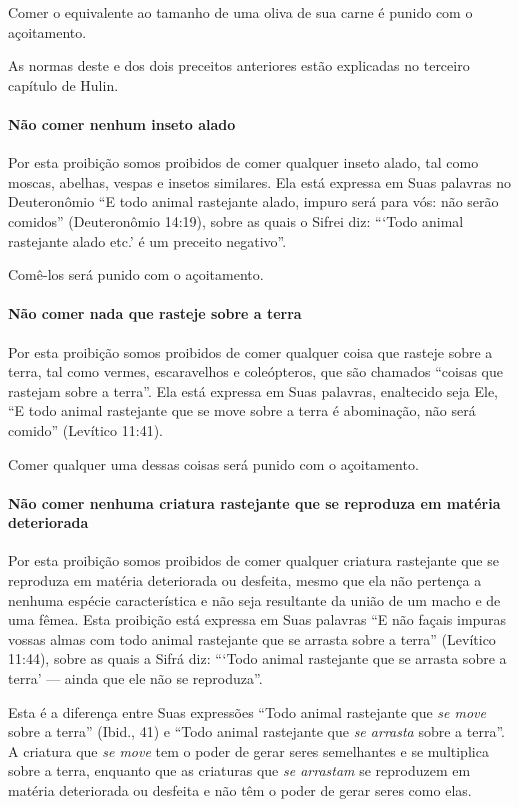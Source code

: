 Comer o equivalente ao tamanho de uma oliva de sua carne é punido com o
açoitamento.

As normas deste e dos dois preceitos anteriores estão explicadas no
terceiro capítulo de Hulin.

\paragraph{Não comer nenhum inseto alado}

Por esta proibição somos proibidos de comer qualquer inseto alado, tal
como moscas, abelhas, vespas e insetos similares. Ela está expressa em
Suas palavras no Deuteronômio ``E todo animal rastejante alado, impuro
será para vós: não serão comidos'' (Deuteronômio 14:19), sobre as quais
o Sifrei diz: ```Todo animal rastejante alado etc.' é um preceito
negativo''.

Comê-los será punido com o açoitamento.

\paragraph{Não comer nada que rasteje sobre a terra}

Por esta proibição somos proibidos de comer qualquer coisa que rasteje
sobre a terra, tal como vermes, escaravelhos e coleópteros, que são
chamados ``coisas que rastejam sobre a terra''. Ela está expressa em
Suas palavras, enaltecido seja Ele, ``E todo animal rastejante que se
move sobre a terra é abominação, não será comido'' (Levítico 11:41).

Comer qualquer uma dessas coisas será punido com o açoitamento.

\paragraph{Não comer nenhuma criatura rastejante que se reproduza em matéria
deteriorada}

Por esta proibição somos proibidos de comer qualquer criatura
rastejante que se reproduza em matéria deteriorada ou desfeita, mesmo
que ela não pertença a nenhuma espécie característica e não seja
resultante da união de um macho e de uma fêmea. Esta proibição está
expressa em Suas palavras
``E não façais impuras vossas almas com todo animal rastejante que se
arrasta sobre a terra'' (Levítico 11:44), sobre as quais a Sifrá diz:
```Todo animal rastejante que se arrasta sobre a terra' --- ainda que
ele não se reproduza''.

Esta é a diferença entre Suas expressões ``Todo animal rastejante que
\emph{se move} sobre a terra'' (Ibid., 41) e ``Todo animal rastejante
que \emph{se arrasta} sobre a terra''. A criatura que \emph{se move} tem
o poder de gerar seres semelhantes e se multiplica sobre a terra,
enquanto que as criaturas que \emph{se arrastam} se reproduzem em
matéria deteriorada ou desfeita e não têm o poder de gerar seres como
elas.

